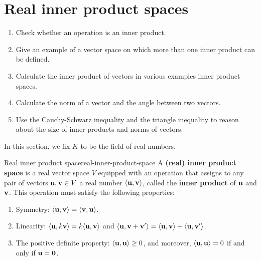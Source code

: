 \section{Real inner product spaces}

\begin{outcome}
  \begin{enumerate}
  \item Check whether an operation is an inner product.
  \item Give an example of a vector space on which more than one inner
    product can be defined.
  \item Calculate the inner product of vectors in various examples
    inner product spaces.
  \item Calculate the norm of a vector and the angle between two vectors.
  \item Use the Cauchy-Schwarz inequality and the triangle inequality
    to reason about the size of inner products and norms of vectors. 
  \end{enumerate}
\end{outcome}

In this section, we fix $K$ to be the field of real numbers.

\begin{definition}{Real inner product space}{real-inner-product-space}
  A \textbf{(real) inner product space}%
   is a real vector space $V$ equipped
  with an operation that assigns to any pair of vectors
  $\vect{u},\vect{v}\in V$ a real number $\iprod{\vect{u},\vect{v}}$,
  called the \textbf{inner product}%
   of $\vect{u}$ and $\vect{v}$. This
  operation must satisfy the following properties:
  \begin{enumerate}
  \item Symmetry:%
    $\iprod{\vect{u},\vect{v}} = \iprod{\vect{v},\vect{u}}$.
  \item Linearity:%
    $\iprod{\vect{u},k\vect{v}} = k\iprod{\vect{u},\vect{v}}$ and
    $\iprod{\vect{u},\vect{v}+\vect{v}'} = \iprod{\vect{u},\vect{v}} +
    \iprod{\vect{u},\vect{v}'}$.
  \item The positive definite property:%
    $\iprod{\vect{u},\vect{u}} \geq 0$, and moreover,
    $\iprod{\vect{u},\vect{u}}=0$ if and only if
    $\vect{u} = \vect{0}$.
  \end{enumerate}
\end{definition}

